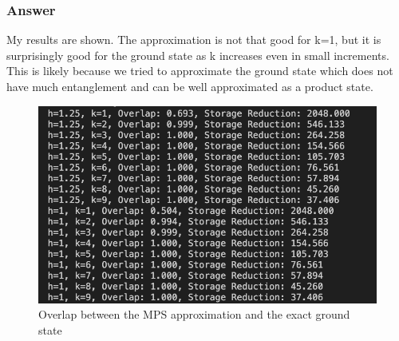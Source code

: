 \documentclass[12pt]{article}
\begin{document}
\subsubsection{Answer}
My results are shown. The approximation is not that good for k=1, but it is surprisingly good for the ground state as k increases even in small increments. This is likely because we tried to approximate the ground state which does not have much entanglement and can be well approximated as a product state. 
\begin{figure}[h]
\centering
\includegraphics[width=\textwidth]{overlap.png}
\caption{Overlap between the MPS approximation and the exact ground state}
\end{figure}
\end{document}
